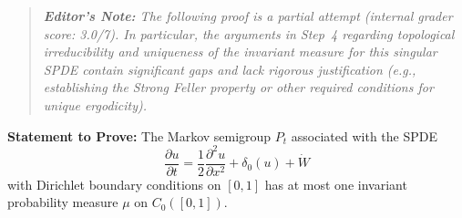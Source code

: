\documentclass[12pt]{article}
\begin{document}
\begin{quote}
\small \emph{\textbf{Editor's Note:} The following proof is a partial attempt (internal grader score: 3.0/7). In particular, the arguments in Step~4 regarding topological irreducibility and uniqueness of the invariant measure for this singular SPDE contain significant gaps and lack rigorous justification (e.g., establishing the Strong Feller property or other required conditions for unique ergodicity).}
\end{quote}

\noindent\textbf{Statement to Prove:} The Markov semigroup $P_t$ associated with the SPDE 
\[ \frac{\partial u}{\partial t} = \frac{1}{2} \frac{\partial^2 u}{\partial x^2} + \delta_0(u) +  \dot{W} \]
with Dirichlet boundary conditions on $[0,1]$ has at most one invariant probability measure $\mu$ on $C_0([0,1])$.
\end{document}
